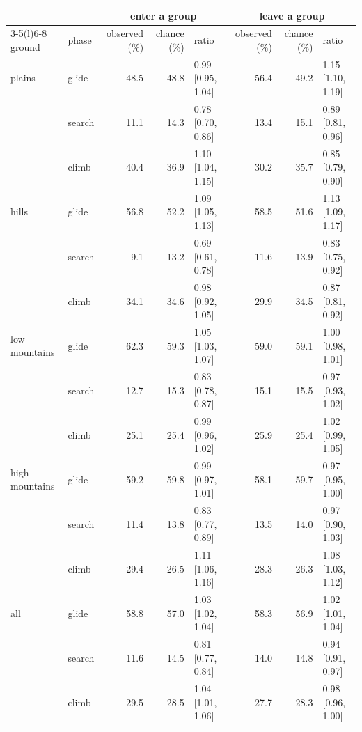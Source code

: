 \begin{tabular}{@{}l l r r l r r l@{}}
\toprule
 & & \multicolumn{3}{c}{enter a group} & \multicolumn{3}{c}{leave a group} \\
\cmidrule(lr){3-5}\cmidrule(l){6-8}
ground & phase & observed (\%) & chance (\%) & ratio & observed (\%) & chance (\%) & ratio \\
\midrule
plains & glide & 48.5 & 48.8 & 0.99 [0.95, 1.04] & 56.4 & 49.2 & 1.15 [1.10, 1.19] \\
 & search & 11.1 & 14.3 & 0.78 [0.70, 0.86] & 13.4 & 15.1 & 0.89 [0.81, 0.96] \\
 & climb & 40.4 & 36.9 & 1.10 [1.04, 1.15] & 30.2 & 35.7 & 0.85 [0.79, 0.90] \\
\addlinespace
hills & glide & 56.8 & 52.2 & 1.09 [1.05, 1.13] & 58.5 & 51.6 & 1.13 [1.09, 1.17] \\
 & search & 9.1 & 13.2 & 0.69 [0.61, 0.78] & 11.6 & 13.9 & 0.83 [0.75, 0.92] \\
 & climb & 34.1 & 34.6 & 0.98 [0.92, 1.05] & 29.9 & 34.5 & 0.87 [0.81, 0.92] \\
\addlinespace
low mountains & glide & 62.3 & 59.3 & 1.05 [1.03, 1.07] & 59.0 & 59.1 & 1.00 [0.98, 1.01] \\
 & search & 12.7 & 15.3 & 0.83 [0.78, 0.87] & 15.1 & 15.5 & 0.97 [0.93, 1.02] \\
 & climb & 25.1 & 25.4 & 0.99 [0.96, 1.02] & 25.9 & 25.4 & 1.02 [0.99, 1.05] \\
\addlinespace
high mountains & glide & 59.2 & 59.8 & 0.99 [0.97, 1.01] & 58.1 & 59.7 & 0.97 [0.95, 1.00] \\
 & search & 11.4 & 13.8 & 0.83 [0.77, 0.89] & 13.5 & 14.0 & 0.97 [0.90, 1.03] \\
 & climb & 29.4 & 26.5 & 1.11 [1.06, 1.16] & 28.3 & 26.3 & 1.08 [1.03, 1.12] \\
\addlinespace
all & glide & 58.8 & 57.0 & 1.03 [1.02, 1.04] & 58.3 & 56.9 & 1.02 [1.01, 1.04] \\
 & search & 11.6 & 14.5 & 0.81 [0.77, 0.84] & 14.0 & 14.8 & 0.94 [0.91, 0.97] \\
 & climb & 29.5 & 28.5 & 1.04 [1.01, 1.06] & 27.7 & 28.3 & 0.98 [0.96, 1.00] \\
\bottomrule
\end{tabular}
